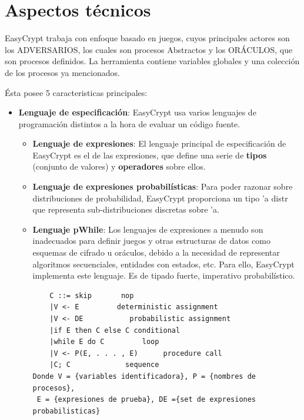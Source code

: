 \documentclass[runningheads,a4paper]{llncs}
\begin{document}
\section{Aspectos técnicos}
EasyCrypt trabaja con enfoque basado en juegos, cuyos principales actores son los ADVERSARIOS, los cuales son procesos Abstractos y los ORÁCULOS, que son procesos definidos. La herramienta contiene variables globales y una colección de los procesos ya mencionados.

Ésta posee 5 caracteristicas principales:
\begin{itemize}
	\item \textbf{Lenguaje de especificación}:
EasyCrypt usa varios lenguajes de programación distintos a la hora de evaluar un código fuente. 

\begin{itemize}
		\item \textbf{Lenguaje de expresiones}:
El lenguaje principal de especificación de EasyCrypt es el de las expresiones, que define una serie de \textbf{tipos} (conjunto de valores) y \textbf{operadores} sobre ellos. 	
	
		\item \textbf{Lenguaje de expresiones probabilísticas}:
Para poder razonar sobre distribuciones de probabilidad, EasyCrypt proporciona un tipo 'a distr que representa sub-distribuciones discretas sobre 'a. 
		\item \textbf{Lenguaje pWhile}:		
Los lenguajes de expresiones a menudo son inadecuados para definir juegos y otras estructuras de datos como esquemas de cifrado u oráculos, debido a la necesidad de representar algoritmos secuenciales, entidades con estados, etc. Para ello, EasyCrypt implementa este lenguaje. Es de tipado fuerte, imperativo probabilístico.

\begin{Verbatim}
	C ::= skip		 nop
	|V <- E		    deterministic assignment
	|V <- DE		   probabilistic assignment
	|if E then C else C	conditional
	|while E do C	      loop
	|V <- P(E, . . . , E)      procedure call
	|C; C		      sequence
Donde V = {variables identificadora}, P = {nombres de procesos},
 E = {expresiones de prueba}, DE ={set de expresiones probabilisticas}
\end{Verbatim}
\end{itemize}


\end{itemize}
\end{document}
